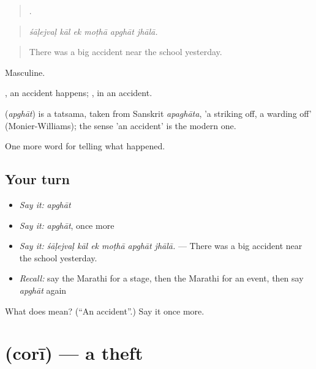 \begin{quote}
     .
\end{quote}

\begin{quote}
\emph{śāḷejvaḷ kāl ek moṭhā apghāt jhālā.}
\end{quote}

\begin{quote}
There was a big accident near the school yesterday.
\end{quote}

Masculine.

 , an accident happens; , in an accident.

\begin{cousinweb}
\textbf{} (\emph{apghāt}) is a tatsama, taken from Sanskrit \emph{apaghāta}, 'a striking off, a warding off' (Monier-Williams); the sense 'an accident' is the modern one.
\end{cousinweb}

\begin{grammarlens}[title={What you've built}]
One more word for telling what happened.
\end{grammarlens}

\subsection*{Your turn}
\begin{itemize}
\raggedright
  \item \emph{Say it:} \emph{apghāt}
  \item \emph{Say it:} \emph{apghāt}, once more
  \item \emph{Say it:} \emph{śāḷejvaḷ kāl ek moṭhā apghāt jhālā.} — There was a big accident near the school yesterday.
  \item \emph{Recall:} say the Marathi for a stage, then the Marathi for an event, then say \emph{apghāt} again
\end{itemize}

\begin{tcolorbox}[breakable,colback=teal!4,colframe=teal!35!black,title={Before you move on}]
What does  mean? (\textquotedblleft{}An accident\textquotedblright{}.) Say it once more.
\end{tcolorbox}
\section[\texorpdfstring{\mr{चोरी} (corī)}{चोरी (corī)}]{ (corī) — a theft}

